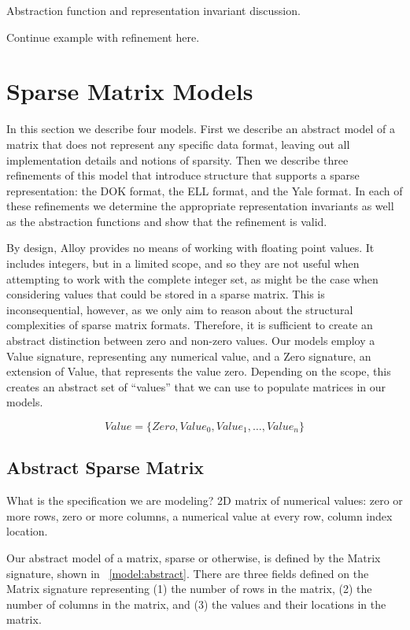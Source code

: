 \documentclass[11pt,conference]{IEEEtran}
\begin{document}
Abstraction function and representation invariant discussion.

Continue example with refinement here.

\section{Sparse Matrix Models}

In this section we describe four models.  First we describe an abstract model of a matrix that does not represent any specific data format, leaving out all implementation details and notions of sparsity. Then we describe three refinements of this model that introduce structure that supports a sparse representation: the DOK format, the ELL format, and the Yale format.  In each of these refinements we determine the appropriate representation invariants as well as the abstraction functions and show that the refinement is valid.

By design, Alloy provides no means of working with floating point values.  It includes integers, but in a limited scope, and so they are not useful when attempting to work with the complete integer set, as might be the case when considering values that could be stored in a sparse matrix.  This is inconsequential, however, as we only aim to reason about the structural complexities of sparse matrix formats.  Therefore, it is sufficient to create an abstract distinction between zero and non-zero values.  Our models employ a Value signature, representing any numerical value, and a Zero signature, an extension of Value, that represents the value zero.  Depending on the scope, this creates an abstract set of ``values'' that we can use to populate matrices in our models.

\begin{displaymath}
Value = \{Zero, Value_0, Value_1, \ldots, Value_n\}
\end{displaymath}

\subsection{Abstract Sparse Matrix}

What is the specification we are modeling?  2D matrix of numerical values: zero or more rows, zero or more columns, a numerical value at every row, column index location.

Our abstract model of a matrix, sparse or otherwise, is defined by the Matrix signature, shown in \figurename~\ref{model:abstract}.  There are three fields defined on the Matrix signature representing (1) the number of rows in the matrix, (2) the number of columns in the matrix, and (3) the values and their locations in the matrix.
\end{document}
